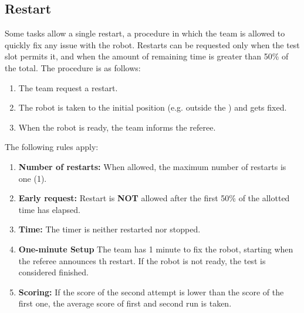 \subsection{Restart}
\label{rule:restart}
Some tasks allow a single restart, a procedure in which the team is allowed to quickly fix any issue with the robot.
Restarts can be requested only when the test slot permits it, and when the amount of remaining time is greater than 50\% of the total.
The procedure is as follows:

\begin{enumerate}
	\item The team request a restart.
	\item The robot is taken to the initial position (e.g. outside the \Arena{}) and gets fixed.
	\item When the robot is ready, the team informs the referee.
\end{enumerate}

The following rules apply:
\begin{enumerate}
	\item \textbf{Number of restarts:} When allowed, the maximum number of restarts is one (1).

	\item \textbf{Early request:} Restart is \textbf{NOT} allowed after the first 50\% of the allotted time has elapsed.

	\item \textbf{Time:} The timer is neither restarted nor stopped.

	\item \textbf{One-minute Setup} The team has 1 minute to fix the robot, starting when the referee announces th restart.
	If the robot is not ready, the test is considered finished.

	\item \textbf{Scoring:} If the score of the second attempt is lower than the score of the first one, the average score of first and second run is taken.
\end{enumerate}

